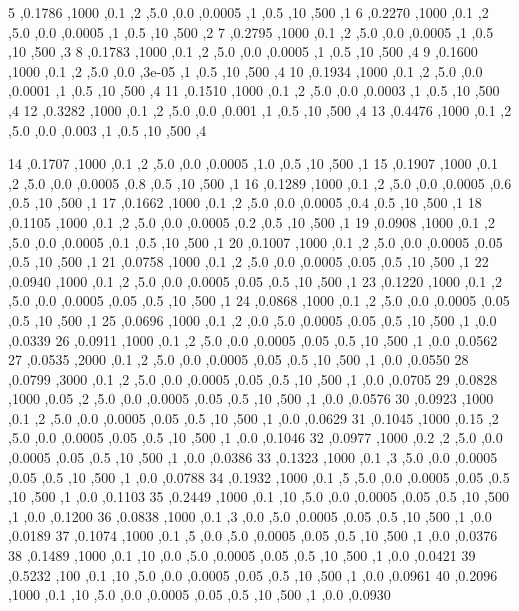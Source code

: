 5 ,0.1786 ,1000 ,0.1 ,2 ,5.0 ,0.0 ,0.0005 ,1 ,0.5 ,10 ,500 ,1
6 ,0.2270 ,1000 ,0.1 ,2 ,5.0 ,0.0 ,0.0005 ,1 ,0.5 ,10 ,500 ,2
7 ,0.2795 ,1000 ,0.1 ,2 ,5.0 ,0.0 ,0.0005 ,1 ,0.5 ,10 ,500 ,3
8 ,0.1783 ,1000 ,0.1 ,2 ,5.0 ,0.0 ,0.0005 ,1 ,0.5 ,10 ,500 ,4
9 ,0.1600 ,1000 ,0.1 ,2 ,5.0 ,0.0 ,3e-05 ,1 ,0.5 ,10 ,500 ,4
10 ,0.1934 ,1000 ,0.1 ,2 ,5.0 ,0.0 ,0.0001 ,1 ,0.5 ,10 ,500 ,4
11 ,0.1510 ,1000 ,0.1 ,2 ,5.0 ,0.0 ,0.0003 ,1 ,0.5 ,10 ,500 ,4
12 ,0.3282 ,1000 ,0.1 ,2 ,5.0 ,0.0 ,0.001 ,1 ,0.5 ,10 ,500 ,4
13 ,0.4476 ,1000 ,0.1 ,2 ,5.0 ,0.0 ,0.003 ,1 ,0.5 ,10 ,500 ,4

14 ,0.1707 ,1000 ,0.1 ,2 ,5.0 ,0.0 ,0.0005 ,1.0 ,0.5 ,10 ,500 ,1
15 ,0.1907 ,1000 ,0.1 ,2 ,5.0 ,0.0 ,0.0005 ,0.8 ,0.5 ,10 ,500 ,1
16 ,0.1289 ,1000 ,0.1 ,2 ,5.0 ,0.0 ,0.0005 ,0.6 ,0.5 ,10 ,500 ,1
17 ,0.1662 ,1000 ,0.1 ,2 ,5.0 ,0.0 ,0.0005 ,0.4 ,0.5 ,10 ,500 ,1
18 ,0.1105 ,1000 ,0.1 ,2 ,5.0 ,0.0 ,0.0005 ,0.2 ,0.5 ,10 ,500 ,1
19 ,0.0908 ,1000 ,0.1 ,2 ,5.0 ,0.0 ,0.0005 ,0.1 ,0.5 ,10 ,500 ,1
20 ,0.1007 ,1000 ,0.1 ,2 ,5.0 ,0.0 ,0.0005 ,0.05 ,0.5 ,10 ,500 ,1
21 ,0.0758 ,1000 ,0.1 ,2 ,5.0 ,0.0 ,0.0005 ,0.05 ,0.5 ,10 ,500 ,1
22 ,0.0940 ,1000 ,0.1 ,2 ,5.0 ,0.0 ,0.0005 ,0.05 ,0.5 ,10 ,500 ,1
23 ,0.1220 ,1000 ,0.1 ,2 ,5.0 ,0.0 ,0.0005 ,0.05 ,0.5 ,10 ,500 ,1
24 ,0.0868 ,1000 ,0.1 ,2 ,5.0 ,0.0 ,0.0005 ,0.05 ,0.5 ,10 ,500 ,1
25 ,0.0696 ,1000 ,0.1 ,2 ,0.0 ,5.0 ,0.0005 ,0.05 ,0.5 ,10 ,500 ,1 ,0.0 ,0.0339
26 ,0.0911 ,1000 ,0.1 ,2 ,5.0 ,0.0 ,0.0005 ,0.05 ,0.5 ,10 ,500 ,1 ,0.0 ,0.0562
27 ,0.0535 ,2000 ,0.1 ,2 ,5.0 ,0.0 ,0.0005 ,0.05 ,0.5 ,10 ,500 ,1 ,0.0 ,0.0550
28 ,0.0799 ,3000 ,0.1 ,2 ,5.0 ,0.0 ,0.0005 ,0.05 ,0.5 ,10 ,500 ,1 ,0.0 ,0.0705
29 ,0.0828 ,1000 ,0.05 ,2 ,5.0 ,0.0 ,0.0005 ,0.05 ,0.5 ,10 ,500 ,1 ,0.0 ,0.0576
30 ,0.0923 ,1000 ,0.1 ,2 ,5.0 ,0.0 ,0.0005 ,0.05 ,0.5 ,10 ,500 ,1 ,0.0 ,0.0629
31 ,0.1045 ,1000 ,0.15 ,2 ,5.0 ,0.0 ,0.0005 ,0.05 ,0.5 ,10 ,500 ,1 ,0.0 ,0.1046
32 ,0.0977 ,1000 ,0.2 ,2 ,5.0 ,0.0 ,0.0005 ,0.05 ,0.5 ,10 ,500 ,1 ,0.0 ,0.0386
33 ,0.1323 ,1000 ,0.1 ,3 ,5.0 ,0.0 ,0.0005 ,0.05 ,0.5 ,10 ,500 ,1 ,0.0 ,0.0788
34 ,0.1932 ,1000 ,0.1 ,5 ,5.0 ,0.0 ,0.0005 ,0.05 ,0.5 ,10 ,500 ,1 ,0.0 ,0.1103
35 ,0.2449 ,1000 ,0.1 ,10 ,5.0 ,0.0 ,0.0005 ,0.05 ,0.5 ,10 ,500 ,1 ,0.0 ,0.1200
36 ,0.0838 ,1000 ,0.1 ,3 ,0.0 ,5.0 ,0.0005 ,0.05 ,0.5 ,10 ,500 ,1 ,0.0 ,0.0189
37 ,0.1074 ,1000 ,0.1 ,5 ,0.0 ,5.0 ,0.0005 ,0.05 ,0.5 ,10 ,500 ,1 ,0.0 ,0.0376
38 ,0.1489 ,1000 ,0.1 ,10 ,0.0 ,5.0 ,0.0005 ,0.05 ,0.5 ,10 ,500 ,1 ,0.0 ,0.0421
39 ,0.5232 ,100 ,0.1 ,10 ,5.0 ,0.0 ,0.0005 ,0.05 ,0.5 ,10 ,500 ,1 ,0.0 ,0.0961
40 ,0.2096 ,1000 ,0.1 ,10 ,5.0 ,0.0 ,0.0005 ,0.05 ,0.5 ,10 ,500 ,1 ,0.0 ,0.0930